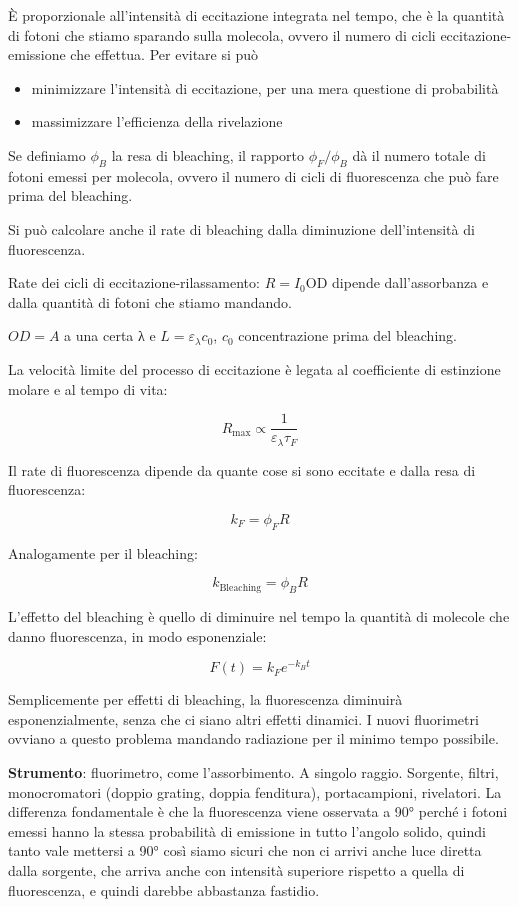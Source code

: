 È proporzionale all'intensità di eccitazione integrata nel tempo, che è
la quantità di fotoni che stiamo sparando sulla molecola, ovvero il
numero di cicli eccitazione-emissione che effettua. Per evitare si può

\begin{itemize}
\item
  minimizzare l'intensità di eccitazione, per una mera questione di
  probabilità
\item
  massimizzare l'efficienza della rivelazione
\end{itemize}

Se definiamo \(\phi_{B}\) la resa di bleaching, il rapporto
\(\phi_{F}/\phi_{B}\) dà il numero totale di fotoni emessi per molecola,
ovvero il numero di cicli di fluorescenza che può fare prima del
bleaching.

Si può calcolare anche il rate di bleaching dalla diminuzione
dell'intensità di fluorescenza.

Rate dei cicli di eccitazione-rilassamento: \(R = I_{0}\text{OD}\)
dipende dall'assorbanza e dalla quantità di fotoni che stiamo mandando.

\(OD = A\) a una certa λ e \(L = \varepsilon_{\lambda}c_{0}\), \(c_{0}\)
concentrazione prima del bleaching.

La velocità limite del processo di eccitazione è legata al coefficiente
di estinzione molare e al tempo di vita:

\[R_{\max} \propto \frac{1}{\varepsilon_{\lambda}\tau_{F}}\]

Il rate di fluorescenza dipende da quante cose si sono eccitate e dalla
resa di fluorescenza:

\[k_{F} = \phi_{F}R\]

Analogamente per il bleaching:

\[k_{\text{Bleaching}} = \phi_{B}R\]

L'effetto del bleaching è quello di diminuire nel tempo la quantità di
molecole che danno fluorescenza, in modo esponenziale:

\[F\left( t \right) = k_{F}e^{- k_{B}t}\]

Semplicemente per effetti di bleaching, la fluorescenza diminuirà
esponenzialmente, senza che ci siano altri effetti dinamici. I nuovi
fluorimetri ovviano a questo problema mandando radiazione per il minimo
tempo possibile.

\textbf{Strumento}: fluorimetro, come l'assorbimento. A singolo raggio.
Sorgente, filtri, monocromatori (doppio grating, doppia fenditura),
portacampioni, rivelatori. La differenza fondamentale è che la
fluorescenza viene osservata a 90° perché i fotoni emessi hanno la
stessa probabilità di emissione in tutto l'angolo solido, quindi tanto
vale mettersi a 90° così siamo sicuri che non ci arrivi anche luce
diretta dalla sorgente, che arriva anche con intensità superiore
rispetto a quella di fluorescenza, e quindi darebbe abbastanza fastidio.

